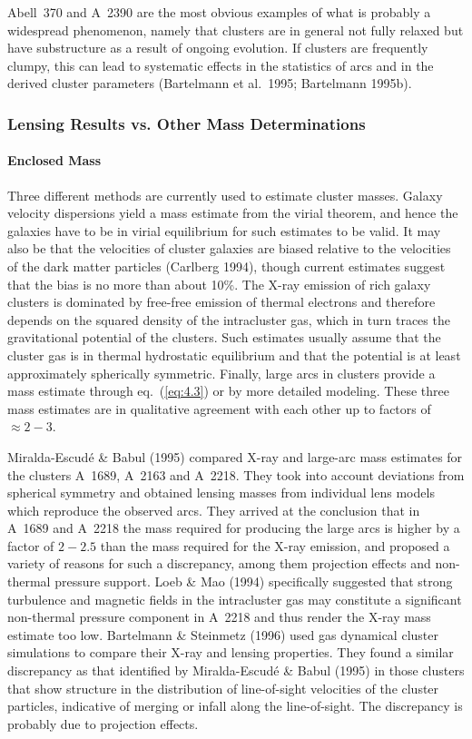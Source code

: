 \documentclass[a4paper,10pt]{article} %
\begin{document}
Abell~370 and A~2390 are the most obvious examples of what is probably
a widespread phenomenon, namely that clusters are in general not fully
relaxed but have substructure as a result of ongoing evolution. If
clusters are frequently clumpy, this can lead to systematic effects in
the statistics of arcs and in the derived cluster parameters
(Bartelmann et al.\ 1995; Bartelmann 1995b).

\subsubsection{Lensing Results vs. Other Mass Determinations}
\label{NB:subsubsect4.1.7}

\paragraph{Enclosed Mass}

Three different methods are currently used to estimate cluster
masses. Galaxy velocity dispersions yield a mass estimate from the
virial theorem, and hence the galaxies have to be in virial
equilibrium for such estimates to be valid. It may also be that the
velocities of cluster galaxies are biased relative to the velocities
of the dark matter particles (Carlberg 1994), though current estimates
suggest that the bias is no more than about 10\%. The X-ray emission
of rich galaxy clusters is dominated by free-free emission of thermal
electrons and therefore depends on the squared density of the
intracluster gas, which in turn traces the gravitational potential of
the clusters. Such estimates usually assume that the cluster gas is in
thermal hydrostatic equilibrium and that the potential is at least
approximately spherically symmetric. Finally, large arcs in clusters
provide a mass estimate through eq.\ (\ref{eq:4.3}) or by more
detailed modeling. These three mass estimates are in qualitative
agreement with each other up to factors of $\approx2-3$.

Miralda-Escud\'e \& Babul (1995) compared X-ray and large-arc mass
estimates for the clusters A~1689, A~2163 and A~2218. They took into
account deviations from spherical symmetry and obtained lensing masses
from individual lens models which reproduce the observed arcs. They
arrived at the conclusion that in A~1689 and A~2218 the mass required
for producing the large arcs is higher by a factor of $2-2.5$ than the
mass required for the X-ray emission, and proposed a variety of
reasons for such a discrepancy, among them projection effects and
non-thermal pressure support. Loeb \& Mao (1994) specifically
suggested that strong turbulence and magnetic fields in the
intracluster gas may constitute a significant non-thermal pressure
component in A~2218 and thus render the X-ray mass estimate too
low. Bartelmann \& Steinmetz (1996) used gas dynamical cluster
simulations to compare their X-ray and lensing properties. They found
a similar discrepancy as that identified by Miralda-Escud\'e \& Babul
(1995) in those clusters that show structure in the distribution of
line-of-sight velocities of the cluster particles, indicative of
merging or infall along the line-of-sight. The discrepancy is probably
due to projection effects.
\end{document}
